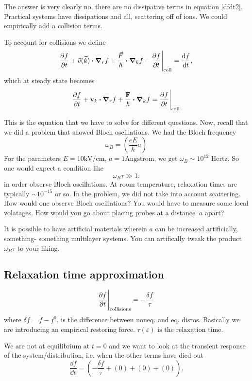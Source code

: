 \documentclass[a4paper]{article}
\newcommand{\hcut}{\hbar}
\begin{document}
The answer is very clearly no, there are no dissipative terms in
equation \ref{dfdt2}. Practical systems have dissipations and all,
scattering off of ions. We could empirically add a collision terms.

To account for collisions we define
\begin{equation}
	\pdv{f}{t} + \vec{v}(\vec{k})\vdot\grad_rf + \frac{\vec{F}}{\hbar}\vdot\grad_k f - \pdv{f}{t}\Bigg|_\text{coll} = \frac{\dd f}{\dd t},
\end{equation}
which at steady state becomes
\begin{equation}
	\label{sstate}
	\pdv{f}{t} + \mathbf{v}_k \vdot \grad_r f + \frac{\textbf{F}}{\hcut}\vdot\grad_k f = \pdv{f}{t}\Bigg|_\text{coll}
\end{equation}

This is the equation that we have to solve for different questions.
Now, recall that we did a problem that showed Bloch oscillations.
We had the Bloch frequency
\begin{equation}
	\omega_B = \left( \frac{eE}{\hbar} a\right) 
\end{equation}
For the parameters $E = 10\text{kV/cm}$,  $a = 1\text{Angstrom}$, we
get  $\omega_B \sim 10^{12} \text{ Hertz}$. So one would expect a
condition like
\[
\omega_B \tau \gg 1
.\] 
in order observe Bloch oscillations.
At room temperature, relaxation times are typically $\sim 10^{-15}$
or so. In the problem, we did not take into account scattering.
How would one observe Bloch oscillations? You would have to measure
some local volatages. How would you go about placing probes at a
distance $~a$ apart?

It is possible to have artificial materials wherein $a$ can be increased artificially, something-
something multilayer systems. You can artifically tweak the product
$\omega_B \tau$ to your liking.

\subsection*{Relaxation time approximation}
\begin{equation}
	\pdv{f}{t}\Bigg|_\text{collisions} = -\frac{\delta f}{\tau}
\end{equation}
where $\delta f = f - f^{0}$, is the difference between noneq. and 
eq. disros. Basically we are introducing an empirical restoring 
force. $\tau(\varepsilon) \text{ is the relaxation time}$.

We are not at equilibrium at $t=0$ and we want to look at the transient
response of the system/distribution, i.e. when the other terms have
died out
\begin{equation}
	\frac{\dd f}{\dd t} = \left( -\frac{\delta f}{\tau} + (0) + (0) + (0) \right).
\end{equation}
\end{document}
